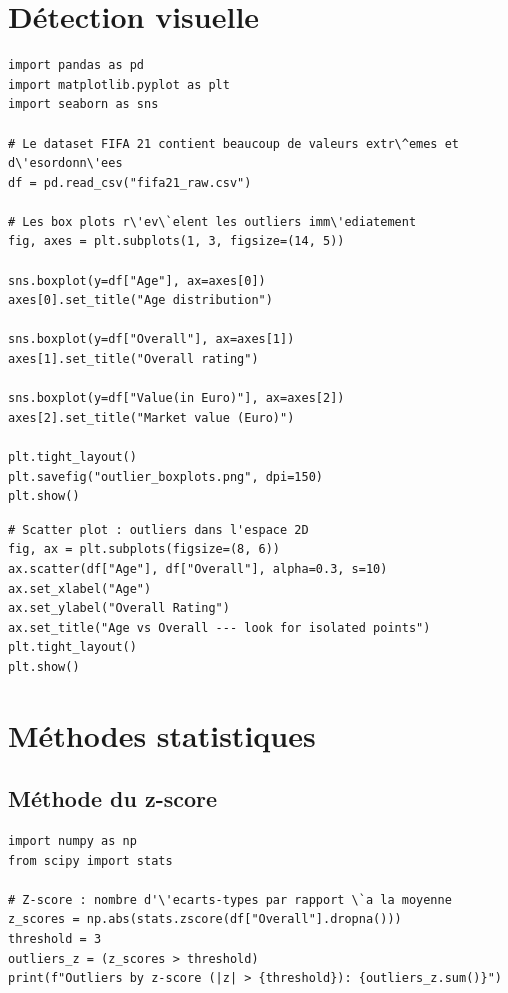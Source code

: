 \section{D\'etection visuelle}

\begin{verbatim}
import pandas as pd
import matplotlib.pyplot as plt
import seaborn as sns

# Le dataset FIFA 21 contient beaucoup de valeurs extr\^emes et d\'esordonn\'ees
df = pd.read_csv("fifa21_raw.csv")

# Les box plots r\'ev\`elent les outliers imm\'ediatement
fig, axes = plt.subplots(1, 3, figsize=(14, 5))

sns.boxplot(y=df["Age"], ax=axes[0])
axes[0].set_title("Age distribution")

sns.boxplot(y=df["Overall"], ax=axes[1])
axes[1].set_title("Overall rating")

sns.boxplot(y=df["Value(in Euro)"], ax=axes[2])
axes[2].set_title("Market value (Euro)")

plt.tight_layout()
plt.savefig("outlier_boxplots.png", dpi=150)
plt.show()
\end{verbatim}

\begin{verbatim}
# Scatter plot : outliers dans l'espace 2D
fig, ax = plt.subplots(figsize=(8, 6))
ax.scatter(df["Age"], df["Overall"], alpha=0.3, s=10)
ax.set_xlabel("Age")
ax.set_ylabel("Overall Rating")
ax.set_title("Age vs Overall --- look for isolated points")
plt.tight_layout()
plt.show()
\end{verbatim}

\section{M\'ethodes statistiques}

\subsection{M\'ethode du z-score}

\begin{verbatim}
import numpy as np
from scipy import stats

# Z-score : nombre d'\'ecarts-types par rapport \`a la moyenne
z_scores = np.abs(stats.zscore(df["Overall"].dropna()))
threshold = 3
outliers_z = (z_scores > threshold)
print(f"Outliers by z-score (|z| > {threshold}): {outliers_z.sum()}")
\end{verbatim}


